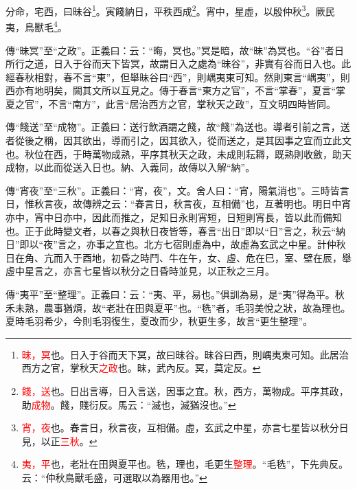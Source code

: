 分命，宅西，曰昧谷\footnote{\textcolor{red}{昧，冥}也。日入于谷而天下冥，故曰昧谷。昧谷曰西，則嵎夷東可知。此居治西方之官，掌秋天\textcolor{red}{之政}也。昧，武內反。冥，莫定反。}。寅餞納日，平秩西成\footnote{\textcolor{red}{餞，送}也。日出言導，日入言送，因事之宜。秋，西方，萬物成。平序其政，助\textcolor{red}{成物}。餞，賤衍反。馬云：“滅也，滅猶沒也。”}。宵中，星虛，以殷仲秋\footnote{\textcolor{red}{宵，夜}也。春言日，秋言夜，互相備。虛，玄武之中星，亦言七星皆以秋分日見，以正\textcolor{red}{三秋}。}。厥民夷，鳥獸毛\footnote{\textcolor{red}{夷，平}也，老壯在田與夏平也。毨，理也，毛更生\textcolor{red}{整理}。“毛毨”，下先典反。云：“仲秋鳥獸毛盛，可選取以為器用也。”}。

{\noindent\zhuan{}\fzbyks 傳“昧冥”至“之政”。正義曰：云：“晦，冥也。”冥是暗，故“昧”為冥也。“谷”者日所行之道，日入于谷而天下皆冥，故謂日入之處為“昧谷”，非實有谷而日入也。此經春秋相對，春不言“東”，但舉昧谷曰“西”，則嵎夷東可知。然則東言“嵎夷”，則西亦有地明矣，闕其文所以互見之。傳于春言“東方之官”，不言“掌春”，夏言“掌夏之官”，不言“南方”，此言“居治西方之官，掌秋天之政”，互文明四時皆同。 \par}

{\noindent\zhuan{}\fzbyks 傳“餞送”至“成物”。正義曰：送行飲酒謂之餞，故“餞”為送也。導者引前之言，送者從後之稱，因其欲出，導而引之，因其欲入，從而送之，是其因事之宜而立此文也。秋位在西，于時萬物成熟，平序其秋天之政，未成則耘耨，既熟則收斂，助天成物，以此而從送入日也。納、入義同，故傳以入解“納”。 \par}

{\noindent\zhuan{}\fzbyks 傳“宵夜”至“三秋”。正義曰：“宵，夜”，文。舍人曰：“宵，陽氣消也”。三時皆言日，惟秋言夜，故傳辨之云：“春言日，秋言夜，互相備”也，互著明也。明日中宵亦中，宵中日亦中，因此而推之，足知日永則宵短，日短則宵長，皆以此而備知也。正于此時變文者，以春之與秋日夜皆等，春言“出日”即以“日”言之，秋云“納日”即以“夜”言之，亦事之宜也。北方七宿則虛為中，故虛為玄武之中星。計仲秋日在角、亢而入于酉地，初昏之時鬥、牛在午，女、虛、危在巳，室、壁在辰，舉虛中星言之，亦言七星皆以秋分之日昏時並見，以正秋之三月。 \par}

{\noindent\zhuan{}\fzbyks 傳“夷平”至“整理”。正義曰：云：“夷、平，易也。”俱訓為易，是“夷”得為平。秋禾未熟，農事猶煩，故“老壯在田與夏平”也。“毨”者，毛羽美悅之狀，故為理也。夏時毛羽希少，今則毛羽復生，夏改而少，秋更生多，故言“更生整理”。 \par}

